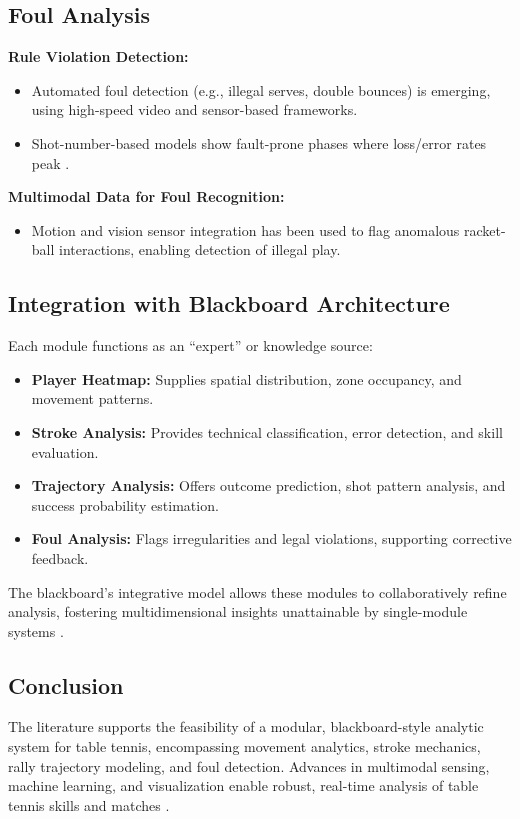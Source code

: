 \documentclass{article}
\begin{document}
\subsection{Foul Analysis}

\textbf{Rule Violation Detection:}
\begin{itemize}
    \item Automated foul detection (e.g., illegal serves, double bounces) is emerging, using high-speed video and sensor-based frameworks.
    \item Shot-number-based models show fault-prone phases where loss/error rates peak \cite{tamaki2017}.
\end{itemize}
\textbf{Multimodal Data for Foul Recognition:}
\begin{itemize}
    \item Motion and vision sensor integration has been used to flag anomalous racket-ball interactions, enabling detection of illegal play.
\end{itemize}

\subsection{Integration with Blackboard Architecture}
Each module functions as an ``expert'' or knowledge source:
\begin{itemize}
    \item \textbf{Player Heatmap:} Supplies spatial distribution, zone occupancy, and movement patterns.
    \item \textbf{Stroke Analysis:} Provides technical classification, error detection, and skill evaluation.
    \item \textbf{Trajectory Analysis:} Offers outcome prediction, shot pattern analysis, and success probability estimation.
    \item \textbf{Foul Analysis:} Flags irregularities and legal violations, supporting corrective feedback.
\end{itemize}

The blackboard’s integrative model allows these modules to collaboratively refine analysis, fostering multidimensional insights unattainable by single-module systems \cite{tamaki2017, sanusi2021}.

\subsection{Conclusion}
The literature supports the feasibility of a modular, blackboard-style analytic system for table tennis, encompassing movement analytics, stroke mechanics, rally trajectory modeling, and foul detection. Advances in multimodal sensing, machine learning, and visualization enable robust, real-time analysis of table tennis skills and matches \cite{tamaki2017, sanusi2021, boonim2023, heatmap2021}.




\end{document}
